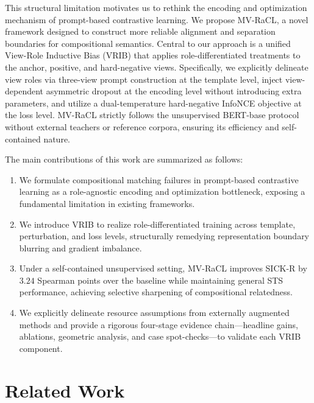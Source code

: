 \documentclass[lettersize,journal]{IEEEtran}
\begin{document}
This structural limitation motivates us to rethink the encoding and optimization mechanism of prompt-based contrastive learning. We propose MV-RaCL, a novel framework designed to construct more reliable alignment and separation boundaries for compositional semantics. Central to our approach is a unified View-Role Inductive Bias (VRIB) that applies role-differentiated treatments to the anchor, positive, and hard-negative views. Specifically, we explicitly delineate view roles via three-view prompt construction at the template level, inject view-dependent asymmetric dropout at the encoding level without introducing extra parameters, and utilize a dual-temperature hard-negative InfoNCE objective at the loss level. MV-RaCL strictly follows the unsupervised BERT-base protocol without external teachers or reference corpora, ensuring its efficiency and self-contained nature.

The main contributions of this work are summarized as follows:

\begin{enumerate}
\item We formulate compositional matching failures in prompt-based contrastive learning as a role-agnostic encoding and optimization bottleneck, exposing a fundamental limitation in existing frameworks.

\item We introduce VRIB to realize role-differentiated training across template, perturbation, and loss levels, structurally remedying representation boundary blurring and gradient imbalance.

\item Under a self-contained unsupervised setting, MV-RaCL improves SICK-R by $3.24$ Spearman points over the baseline while maintaining general STS performance, achieving selective sharpening of compositional relatedness.

\item We explicitly delineate resource assumptions from externally augmented methods and provide a rigorous four-stage evidence chain---headline gains, ablations, geometric analysis, and case spot-checks---to validate each VRIB component.
\end{enumerate}

\section{Related Work}
\label{sec:related}
\end{document}

